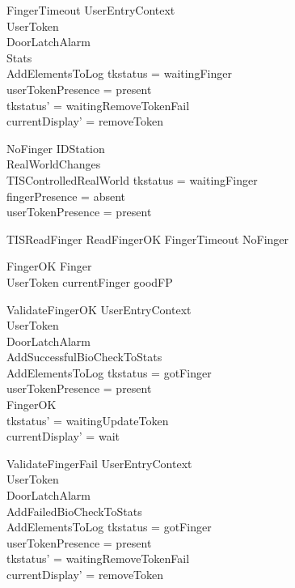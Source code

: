 \begin{schema}{FingerTimeout}
  UserEntryContext\\
  \Xi UserToken\\
  \Xi DoorLatchAlarm\\
  \Xi Stats\\
  AddElementsToLog
\where
  tkstatus = waitingFinger\\
  userTokenPresence = present\\
  tkstatus' = waitingRemoveTokenFail\\
  currentDisplay' = removeToken
\end{schema}

\begin{schema}{NoFinger}
  \Xi IDStation\\
  RealWorldChanges\\
  \Xi TISControlledRealWorld
\where
  tkstatus = waitingFinger\\
  fingerPresence = absent\\
  userTokenPresence = present
\end{schema}

\begin{zed}
TISReadFinger  ReadFingerOK \lor  FingerTimeout \lor  NoFinger \lor  [UserTokenTorn | tkstatus = waitingFinger]
\end{zed}

\begin{schema}{FingerOK}
  Finger\\
  UserToken
\where
  currentFinger \in  \ran  goodFP
\end{schema}

\begin{schema}{ValidateFingerOK}
  UserEntryContext\\
  \Xi UserToken\\
  \Xi DoorLatchAlarm\\
  AddSuccessfulBioCheckToStats\\
  AddElementsToLog
\where
  tkstatus = gotFinger\\
  userTokenPresence = present\\
  FingerOK\\
  tkstatus' = waitingUpdateToken\\
  currentDisplay' = wait
\end{schema}

\begin{schema}{ValidateFingerFail}
  UserEntryContext\\
  \Xi UserToken\\
  \Xi DoorLatchAlarm\\
  AddFailedBioCheckToStats\\
  AddElementsToLog
\where
  tkstatus = gotFinger\\
  userTokenPresence = present\\
  tkstatus' = waitingRemoveTokenFail\\
  currentDisplay' = removeToken
\end{schema}

